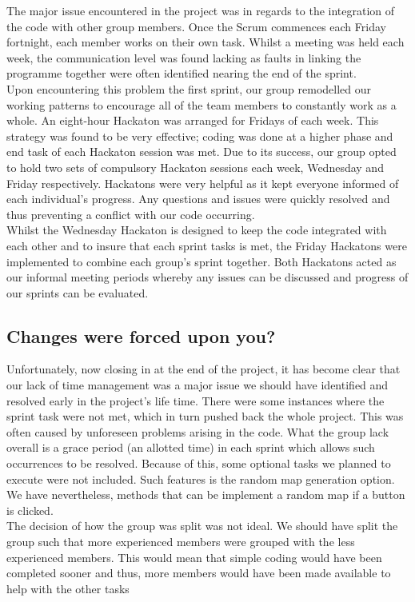 \documentclass{article}[11pt,Tahoma]
\begin{document}
			The major issue encountered in the project was in regards to the integration of the code with other group members. Once the Scrum commences each Friday fortnight, each member works on their own task.  Whilst a meeting was held each week, the communication level was found lacking as faults in linking the programme together were often identified nearing the end of the sprint.\\
			
			Upon encountering this problem the first sprint, our group remodelled our working patterns to encourage all of the team members to constantly work as a whole.  An eight-hour Hackaton was arranged for Fridays of each week.  This strategy was found to be very effective; coding was done at a higher phase and end task of each Hackaton session was met.  Due to its success, our group opted to hold two sets of compulsory Hackaton sessions each week, Wednesday and Friday respectively.  Hackatons were very helpful as it kept everyone informed of each individual's progress. Any questions and issues were quickly resolved and thus preventing a conflict with our code occurring.\\
			
			Whilst the Wednesday Hackaton is designed to keep the code integrated with each other and to insure that each sprint tasks is met, the Friday Hackatons were implemented to combine each group's sprint together. Both Hackatons acted as our informal meeting periods whereby any issues can be discussed and progress of our sprints can be evaluated.
		\subsection{Changes were forced upon you? }
			Unfortunately, now closing in at the end of the project, it has become clear that our lack of time management was a major issue we should have identified and resolved early in the project's life time. There were some instances where the sprint task were not met, which in turn pushed back the whole project. This was often caused by  unforeseen problems arising in the code. What the group lack overall is a grace period (an allotted time) in each sprint which allows such occurrences to be resolved. Because of this, some optional tasks we planned to execute were not included. Such features is the random map generation option.  We have nevertheless, methods that can be implement a random map if a button is clicked. \\
			
			The decision of how the group was split was not ideal. We should have split the group such that more experienced members were grouped with the less experienced members.  This would mean that simple  coding would have been completed sooner and thus, more members would have been made available to help with the other tasks
\end{document}

